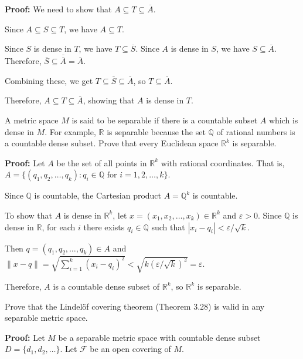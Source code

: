 \textbf{Proof:} We need to show that $A \subseteq T \subseteq \overline{A}$.

Since $A \subseteq S \subseteq T$, we have $A \subseteq T$.

Since $S$ is dense in $T$, we have $T \subseteq \overline{S}$. Since $A$ is dense in $S$, we have $S \subseteq \overline{A}$. Therefore, $\overline{S} \subseteq \overline{\overline{A}} = \overline{A}$.

Combining these, we get $T \subseteq \overline{S} \subseteq \overline{A}$, so $T \subseteq \overline{A}$.

Therefore, $A \subseteq T \subseteq \overline{A}$, showing that $A$ is dense in $T$.

\begin{problembox}
A metric space \( M \) is said to be separable if there is a countable subset \( A \) which is dense in \( M \). For example, \( \mathbb{R} \) is separable because the set \( \mathbb{Q} \) of rational numbers is a countable dense subset. Prove that every Euclidean space \( \mathbb{R}^k \) is separable.
\end{problembox}

\textbf{Proof:} Let $A$ be the set of all points in $\mathbb{R}^k$ with rational coordinates. That is, $A = \{(q_1, q_2, \ldots, q_k) : q_i \in \mathbb{Q} \text{ for } i = 1,2,\ldots,k\}$.

Since $\mathbb{Q}$ is countable, the Cartesian product $A = \mathbb{Q}^k$ is countable.

To show that $A$ is dense in $\mathbb{R}^k$, let $x = (x_1, x_2, \ldots, x_k) \in \mathbb{R}^k$ and $\varepsilon > 0$. Since $\mathbb{Q}$ is dense in $\mathbb{R}$, for each $i$ there exists $q_i \in \mathbb{Q}$ such that $|x_i - q_i| < \varepsilon/\sqrt{k}$.

Then $q = (q_1, q_2, \ldots, q_k) \in A$ and $\|x - q\| = \sqrt{\sum_{i=1}^k (x_i - q_i)^2} < \sqrt{k(\varepsilon/\sqrt{k})^2} = \varepsilon$.

Therefore, $A$ is a countable dense subset of $\mathbb{R}^k$, so $\mathbb{R}^k$ is separable.

\begin{problembox}
Prove that the Lindelöf covering theorem (Theorem 3.28) is valid in any separable metric space.
\end{problembox}

\textbf{Proof:} Let $M$ be a separable metric space with countable dense subset $D = \{d_1, d_2, \ldots\}$. Let $\mathcal{F}$ be an open covering of $M$.

